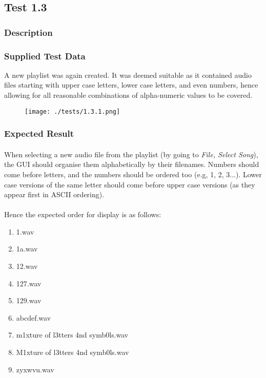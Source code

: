 \pagebreak
\subsection{Test 1.3}
\subsubsection*{Description}
\paragraph{}
{
	\centering
}

\subsubsection*{Supplied Test Data}
A new playlist was again created. It was deemed suitable as it contained audio files starting with upper case letters, lower case letters, and even numbers, hence allowing for all reasonable combinations of alpha-numeric values to be covered.
\begin{figure}[H]
	\texttt{[image: ./tests/1.3.1.png]}
\end{figure}

\subsubsection*{Expected Result}
\paragraph{}
When selecting a new audio file from the playlist (by going to \textit{File, Select Song}), the GUI should organise them alphabetically by their filenames. Numbers should come before letters, and the numbers should be ordered too (e.g, 1, 2, 3...). Lower case versions of the same letter should come before upper case versions (as they appear first in ASCII ordering).
\paragraph{}
Hence the expected order for display is as follows:
\begin{enumerate}
	\item 1.wav
	\item 1a.wav
	\item 12.wav
	\item 127.wav
	\item 129.wav
	\item abcdef.wav
	\item m1xture of l3tters 4nd symb0ls.wav
	\item M1xture of l3tters 4nd symb0ls.wav
	\item zyxwvu.wav
\end{enumerate}

